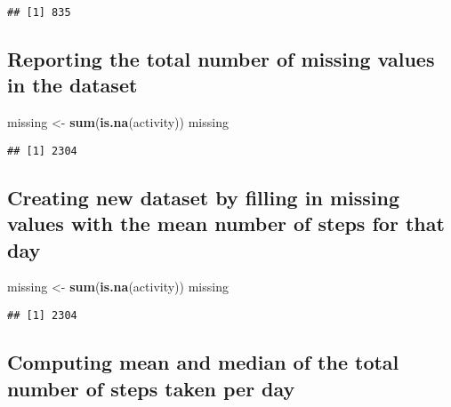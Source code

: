 \documentclass[]{article}
\newenvironment{Shaded}{\begin{snugshade}}{\end{snugshade}}
\newcommand{\KeywordTok}[1]{\textcolor[rgb]{0.13,0.29,0.53}{\textbf{{#1}}}}
\newcommand{\DataTypeTok}[1]{\textcolor[rgb]{0.13,0.29,0.53}{{#1}}}
\newcommand{\StringTok}[1]{\textcolor[rgb]{0.31,0.60,0.02}{{#1}}}
\newcommand{\OtherTok}[1]{\textcolor[rgb]{0.56,0.35,0.01}{{#1}}}
\newcommand{\NormalTok}[1]{{#1}}
\begin{document}
\begin{verbatim}
## [1] 835
\end{verbatim}

\subsection{Reporting the total number of missing values in the
dataset}\label{reporting-the-total-number-of-missing-values-in-the-dataset}

\begin{Shaded}
\begin{Highlighting}[]
\NormalTok{missing <-}\StringTok{ }\KeywordTok{sum}\NormalTok{(}\KeywordTok{is.na}\NormalTok{(activity))}
\NormalTok{missing}
\end{Highlighting}
\end{Shaded}

\begin{verbatim}
## [1] 2304
\end{verbatim}

\subsection{Creating new dataset by filling in missing values with the
mean number of steps for that
day}\label{creating-new-dataset-by-filling-in-missing-values-with-the-mean-number-of-steps-for-that-day}

\begin{Shaded}
\begin{Highlighting}[]
\NormalTok{missing <-}\StringTok{ }\KeywordTok{sum}\NormalTok{(}\KeywordTok{is.na}\NormalTok{(activity))}
\NormalTok{missing}
\end{Highlighting}
\end{Shaded}

\begin{verbatim}
## [1] 2304
\end{verbatim}

\subsection{Computing mean and median of the total number of steps taken
per
day}\label{computing-mean-and-median-of-the-total-number-of-steps-taken-per-day}

\begin{Shaded}
\end{Shaded}
\end{document}
